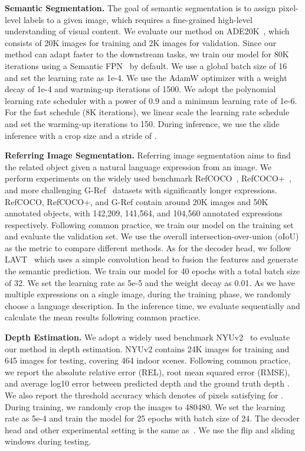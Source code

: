 \documentclass[10pt,twocolumn,letterpaper]{article}
\newcommand{\paragrapha}[2][4pt]{\vspace{#1}\noindent\textbf{#2}}
\begin{document}
\paragrapha{Semantic Segmentation.} The goal of semantic segmentation is to assign pixel-level labels to a given image, which requires a fine-grained high-level understanding of visual content. We evaluate our method on ADE20K~\cite{zhou2017ade}, which consists of 20K images for training and 2K images for validation. Since our method can adapt faster to the downstream tasks, we train our model for 80K iterations using a Semantic FPN~\cite{kirillov2019semanticfpn} by default. We use a global batch size of 16 and set the learning rate as 1e-4. We use the AdamW optimizer with a weight decay of 1e-4 and warming-up iterations of 1500. We adopt the polynomial learning rate scheduler with a power of 0.9 and a minimum learning rate of 1e-6. For the fast schedule (8K iterations), we linear scale the learning rate schedule and set the warming-up iterations to 150. During inference, we use the slide inference with a crop size  and a stride of .

\paragrapha{Referring Image Segmentation.} Referring image segmentation aims to find the related object given a natural language expression from an image. We perform experiments on the widely used benchmark RefCOCO~\cite{yu2016refcoco}, RefCOCO+~\cite{yu2016refcoco}, and more challenging G-Ref~\cite{nagaraja2016modeling} datasets with significantly longer expressions. RefCOCO, RefCOCO+, and G-Ref contain around 20K images and 50K annotated objects, with 142,209, 141,564,  and 104,560 annotated expressions respectively. Following common practice, we train our model on the training set and evaluate the validation set. We use the overall intersection-over-union (oIoU) as the metric to compare different methods. As for the decoder head, we follow LAVT~\cite{yang2022lavt} which uses a simple convolution head to fusion the features and generate the semantic prediction. We train our model for 40 epochs with a total batch size of 32. We set the learning rate as 5e-5 and the weight decay as 0.01. As we have multiple expressions on a single image, during the training phase, we randomly choose a language description. In the inference time, we evaluate sequentially and calculate the mean results following common practice. 

\paragrapha{Depth Estimation.} We adopt a widely used benchmark NYUv2~\cite{silberman2012nyuv2} to evaluate our method in depth estimation. NYUv2 contains 24K images for training and 645 images for testing, covering 464 indoor scenes. Following common practice, we report the absolute relative error (REL), root mean squared error (RMSE), and average log10 error between predicted depth  and the ground truth depth . We also report the threshold accuracy  which denotes  of pixels satisfying  for . During training, we randomly crop the images to 480480. We set the learning rate as 5e-4 and train the model for 25 epochs with batch size of 24. The decoder head and other experimental setting is the same as~\cite{xie2022revealing}. We use the flip and sliding windows during testing.
\end{document}

